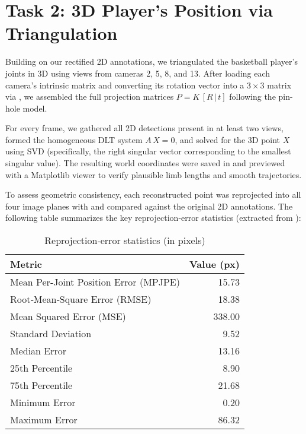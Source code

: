 \documentclass[11pt,a4paper]{article}
\begin{document}
\section*{Task 2: 3D Player’s Position via Triangulation}

Building on our rectified 2D annotations, we triangulated the basketball player’s joints in 3D using views from cameras 2, 5, 8, and 13. After loading each camera’s intrinsic matrix and converting its rotation vector into a $3\times3$ matrix via , we assembled the full projection matrices $P = K\,[R\,|\,t]$ following the pin-hole model.  

For every frame, we gathered all 2D detections present in at least two views, formed the homogeneous DLT system $A\,X=0$, and solved for the 3D point $X$ using SVD (specifically, the right singular vector corresponding to the smallest singular value). The resulting world coordinates were saved in  and previewed with a Matplotlib viewer to verify plausible limb lengths and smooth trajectories.

To assess geometric consistency, each reconstructed point was reprojected into all four image planes with  and compared against the original 2D annotations. The following table summarizes the key reprojection‐error statistics (extracted from ):

\begin{table}[htbp]
  \centering
  \caption{Reprojection‐error statistics (in pixels)}
  \label{tab:reproj-errors}
  \begin{tabular}{l r}
    \toprule
    \textbf{Metric}           & \textbf{Value (px)} \\
    \midrule
    Mean Per‐Joint Position Error (MPJPE) & 15.73 \\
    Root‐Mean‐Square Error (RMSE)         & 18.38 \\
    Mean Squared Error (MSE)             & 338.00 \\
    Standard Deviation                   & 9.52  \\
    Median Error                         & 13.16 \\
    25th Percentile                      & 8.90  \\
    75th Percentile                      & 21.68 \\
    Minimum Error                        & 0.20  \\
    Maximum Error                        & 86.32 \\
    \bottomrule
  \end{tabular}
\end{table}
\end{document}
